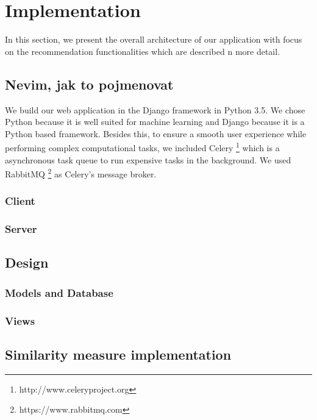 \section{Implementation}
In this section, we present the overall architecture of our application with focus on the recommendation functionalities which are described n more detail. 

\subsection{Nevim, jak to pojmenovat}

We build our web application in the Django framework in Python 3.5. We chose Python because it is well suited for machine learning and Django because it is a Python based framework. Besides this, to ensure a smooth user experience while performing complex computational tasks, we included Celery \footnote{http://www.celeryproject.org} which is a asynchronous task queue to run expensive tasks in the background. We used RabbitMQ \footnote{https://www.rabbitmq.com} as Celery's message broker.

\subsubsection{Client}

\subsubsection{Server}

\subsection{Design}

\subsubsection{Models and Database}

\subsubsection{Views}


\subsection{Similarity measure implementation}

